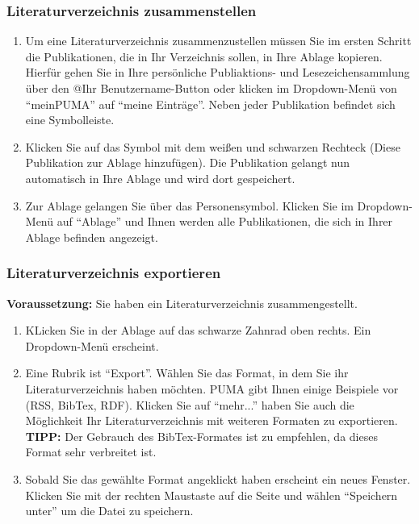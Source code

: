 \documentclass[a4paper,11pt,twoside]{scrbook}
\begin{document}
\subsubsection{Literaturverzeichnis zusammenstellen}
\begin{enumerate}
    \item Um eine Literaturverzeichnis zusammenzustellen müssen Sie im ersten Schritt die Publikationen, die in Ihr Verzeichnis sollen, in Ihre Ablage kopieren. Hierfür gehen Sie in Ihre persönliche Publiaktions- und Lesezeichensammlung über den @Ihr Benutzername-Button oder klicken im Dropdown-Menü von \enquote{meinPUMA} auf \enquote{meine Einträge}.  Neben jeder Publikation befindet sich eine Symbolleiste.
    \item Klicken Sie auf das Symbol mit dem weißen und schwarzen Rechteck (Diese Publikation zur Ablage hinzufügen). Die Publikation gelangt nun automatisch in Ihre Ablage und wird dort gespeichert.
    \item Zur Ablage gelangen Sie über das Personensymbol. Klicken Sie im Dropdown-Menü auf \enquote{Ablage} und Ihnen werden alle Publikationen, die sich in Ihrer Ablage befinden angezeigt. 
\end{enumerate}
\subsubsection{Literaturverzeichnis exportieren}
\textbf{Voraussetzung:} Sie haben ein Literaturverzeichnis zusammengestellt.
\begin{enumerate}
    \item KLicken Sie in der Ablage auf das schwarze Zahnrad oben rechts. Ein Dropdown-Menü erscheint.
    \item Eine Rubrik ist \enquote{Export}. Wählen Sie das Format, in dem Sie ihr Literaturverzeichnis haben möchten. PUMA gibt Ihnen einige Beispiele vor (RSS, BibTex, RDF). Klicken Sie auf \enquote{mehr...} haben Sie auch die Möglichkeit Ihr Literaturverzeichnis mit weiteren Formaten zu exportieren. \textbf{TIPP:} Der Gebrauch des BibTex-Formates ist zu empfehlen, da dieses Format sehr verbreitet ist.
    \item Sobald Sie das gewählte Format angeklickt haben erscheint ein neues Fenster. Klicken Sie mit der rechten Maustaste auf die Seite und wählen \enquote{Speichern unter} um die Datei zu speichern.
\end{enumerate}
\end{document}

